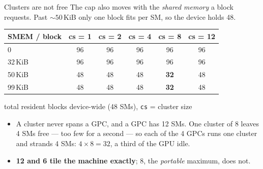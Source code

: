 \documentclass[aspectratio=169, numbering=fraction]{beamer}
\begin{document}
\begin{frame}{Clusters are not free}
  \vspace{0.5em}
  \footnotesize
  The cap also moves with the \emph{shared memory} a block requests. Past
  ${\sim}50$\,KiB only one block fits per SM, so the device holds 48.

  \vspace{0.4em}
  \centering
  \begin{tabular}{lccccc}
    \toprule
    \textbf{SMEM / block} & \textbf{cs = 1} & \textbf{cs = 2} & \textbf{cs = 4} & \textbf{cs = 8} & \textbf{cs = 12} \\
    \midrule
    0            & 96 & 96 & 96 & 96          & 96 \\
    32\,KiB      & 96 & 96 & 96 & 96          & 96 \\
    50\,KiB      & 48 & 48 & 48 & \textbf{32} & 48 \\
    99\,KiB      & 48 & 48 & 48 & \textbf{32} & 48 \\
    \bottomrule
  \end{tabular}

  \vspace{0.3em}
  {\scriptsize total resident blocks device-wide (48 SMs), \texttt{cs} = cluster size}

  \vspace{0.6em}
  \raggedright
  \begin{itemize}\itemsep1pt
    \item A cluster never spans a GPC, and a GPC has 12 SMs. One cluster of 8 leaves 4 SMs free --- too few for a second --- so each of the 4 GPCs runs one cluster and strands 4 SMs: $4 \times 8 = 32$, a third of the GPU idle.
    \item \textbf{12 and 6 tile the machine exactly}; 8, the \emph{portable}
          maximum, does not.
  \end{itemize}

\end{frame}

\end{document}
